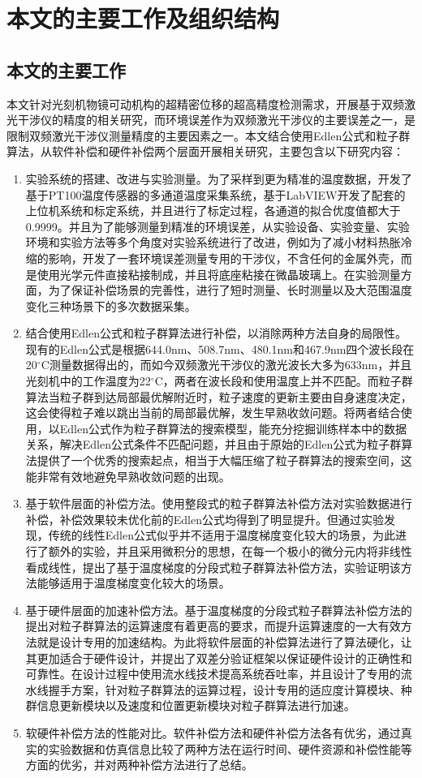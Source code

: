 \section{本文的主要工作及组织结构}
\subsection{本文的主要工作}
本文针对光刻机物镜可动机构的超精密位移的超高精度检测需求，开展基于双频激光干涉仪的精度的相关研究，而环境误差作为双频激光干涉仪的主要误差之一，是限制双频激光干涉仪测量精度的主要因素之一。本文结合使用Edlen公式和粒子群算法，从软件补偿和硬件补偿两个层面开展相关研究，主要包含以下研究内容：
\begin{enumerate}
    \item 实验系统的搭建、改进与实验测量。为了采样到更为精准的温度数据，开发了基于PT100温度传感器的多通道温度采集系统，基于LabVIEW开发了配套的上位机系统和标定系统，并且进行了标定过程，各通道的拟合优度值都大于0.9999。并且为了能够测量到精准的环境误差，从实验设备、实验变量、实验环境和实验方法等多个角度对实验系统进行了改进，例如为了减小材料热胀冷缩的影响，开发了一套环境误差测量专用的干涉仪，不含任何的金属外壳，而是使用光学元件直接粘接制成，并且将底座粘接在微晶玻璃上。在实验测量方面，为了保证补偿场景的完善性，进行了短时测量、长时测量以及大范围温度变化三种场景下的多次数据采集。
    \item 结合使用Edlen公式和粒子群算法进行补偿，以消除两种方法自身的局限性。现有的Edlen公式是根据644.0nm、508.7nm、480.1nm和467.9nm四个波长段在20$^{\circ}\mathrm{C}$测量数据得出的，而如今双频激光干涉仪的激光波长大多为633nm，并且光刻机中的工作温度为22$^{\circ} \mathrm{C}$，两者在波长段和使用温度上并不匹配。而粒子群算法当粒子群到达局部最优解附近时，粒子速度的更新主要由自身速度决定，这会使得粒子难以跳出当前的局部最优解，发生早熟收敛问题。将两者结合使用，以Edlen公式作为粒子群算法的搜索模型，能充分挖掘训练样本中的数据关系，解决Edlen公式条件不匹配问题，并且由于原始的Edlen公式为粒子群算法提供了一个优秀的搜索起点，相当于大幅压缩了粒子群算法的搜索空间，这能非常有效地避免早熟收敛问题的出现。
    \item 基于软件层面的补偿方法。使用整段式的粒子群算法补偿方法对实验数据进行补偿，补偿效果较未优化前的Edlen公式均得到了明显提升。但通过实验发现，传统的线性Edlen公式似乎并不适用于温度梯度变化较大的场景，为此进行了额外的实验，并且采用微积分的思想，在每一个极小的微分元内将非线性看成线性，提出了基于温度梯度的分段式粒子群算法补偿方法，实验证明该方法能够适用于温度梯度变化较大的场景。
    \item 基于硬件层面的加速补偿方法。基于温度梯度的分段式粒子群算法补偿方法的提出对粒子群算法的运算速度有着更高的要求，而提升运算速度的一大有效方法就是设计专用的加速结构。为此将软件层面的补偿算法进行了算法硬化，让其更加适合于硬件设计，并提出了双差分验证框架以保证硬件设计的正确性和可靠性。在设计过程中使用流水线技术提高系统吞吐率，并且设计了专用的流水线握手方案，针对粒子群算法的运算过程，设计专用的适应度计算模块、种群信息更新模块以及速度和位置更新模块对粒子群算法进行加速。
    \item 软硬件补偿方法的性能对比。软件补偿方法和硬件补偿方法各有优劣，通过真实的实验数据和仿真信息比较了两种方法在运行时间、硬件资源和补偿性能等方面的优劣，并对两种补偿方法进行了总结。
  \end{enumerate}
